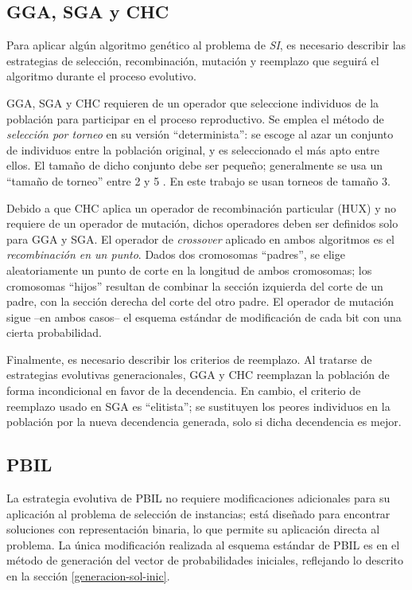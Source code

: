 \subsection{GGA, SGA y CHC}

Para aplicar algún algoritmo genético al problema de \emph{SI}, es necesario describir las estrategias de selección, recombinación, mutación y reemplazo que seguirá el algoritmo durante el proceso evolutivo.

GGA, SGA y CHC requieren de un operador que seleccione individuos de la población para participar en el proceso reproductivo. Se emplea el método de \emph{selección por torneo} en su versión ``determinista'': se escoge al azar un conjunto de individuos entre la población original, y es seleccionado el más apto entre ellos. El tamaño de dicho conjunto debe ser pequeño; generalmente se usa un ``tamaño de torneo'' entre 2 y 5 \cite{Miller95geneticalgorithms}. En este trabajo se usan torneos de tamaño 3.

Debido a que CHC aplica un operador de recombinación particular (HUX) y no requiere de un operador de mutación, dichos operadores deben ser definidos solo para GGA y SGA. El operador de \emph{crossover} aplicado en ambos algoritmos es el \emph{recombinación en un punto}. Dados dos cromosomas ``padres'', se elige aleatoriamente un punto de corte en la longitud de ambos cromosomas; los cromosomas ``hijos'' resultan de combinar la sección izquierda del corte de un padre, con la sección derecha del corte del otro padre. El operador de mutación sigue --en ambos casos-- el esquema estándar de modificación de cada bit con una cierta probabilidad.

Finalmente, es necesario describir los criterios de reemplazo. Al tratarse de estrategias evolutivas generacionales, GGA y CHC reemplazan la población de forma incondicional en favor de la decendencia. En cambio, el criterio de reemplazo usado en SGA es ``elitista''; se sustituyen los peores individuos en la población por la nueva decendencia generada, solo si dicha decendencia es mejor.

\subsection{PBIL}

La estrategia evolutiva de PBIL no requiere modificaciones adicionales para su aplicación al problema de selección de instancias; está diseñado para encontrar soluciones con representación binaria, lo que permite su aplicación directa al problema. La única modificación realizada al esquema estándar de PBIL es en el método de generación del vector de probabilidades iniciales, reflejando lo descrito en la sección \ref{generacion-sol-inic}.


